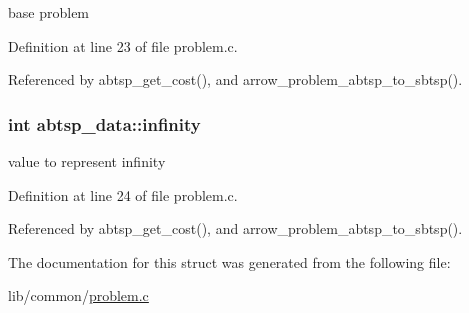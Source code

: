 base problem 

Definition at line 23 of file problem.c.

Referenced by abtsp\_\-get\_\-cost(), and arrow\_\-problem\_\-abtsp\_\-to\_\-sbtsp().\hypertarget{structabtsp__data_574a2f0aaf850223729244a9d2a0a4a5}{
\subsubsection[{infinity}]{\setlength{\rightskip}{0pt plus 5cm}int {\bf abtsp\_\-data::infinity}}}
\label{structabtsp__data_574a2f0aaf850223729244a9d2a0a4a5}


value to represent infinity 

Definition at line 24 of file problem.c.

Referenced by abtsp\_\-get\_\-cost(), and arrow\_\-problem\_\-abtsp\_\-to\_\-sbtsp().

The documentation for this struct was generated from the following file:\begin{CompactItemize}
\item 
lib/common/\hyperlink{problem_8c}{problem.c}\end{CompactItemize}
